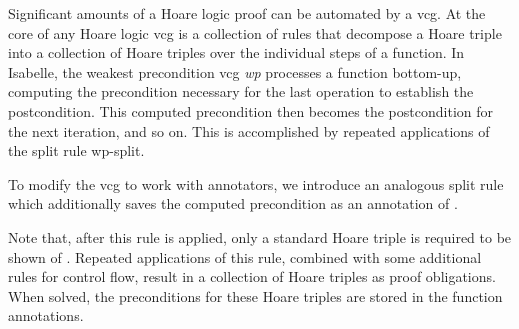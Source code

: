 \documentclass[submission]{eptcs}
\begin{document}
\begin{isabellebody}
\begin{isamarkuptext}
Significant amounts of a Hoare logic proof can be
automated by a vcg. At the core of any Hoare logic
vcg is a collection of rules that decompose a Hoare
triple into a collection of Hoare triples over
the individual steps of a function. In Isabelle, the weakest precondition
vcg \emph{wp} processes a function bottom-up, computing the
precondition necessary for the last operation to establish
the postcondition. This computed precondition then becomes
the postcondition for the next iteration, and so on.
This is accomplished by repeated applications of the split rule {\sc wp-split}.

To modify the vcg to work with annotators, we
introduce an analogous split rule which additionally 
saves the computed precondition as an annotation of .

Note that, after this rule is applied, 
only a standard Hoare triple is required to be shown of .
Repeated applications of this rule, combined with some additional
rules for control flow, result in a collection of Hoare triples as
proof obligations. When solved, the preconditions for these
Hoare triples are stored in the function annotations. 


\end{isamarkuptext}
\end{isabellebody}
\end{document}
